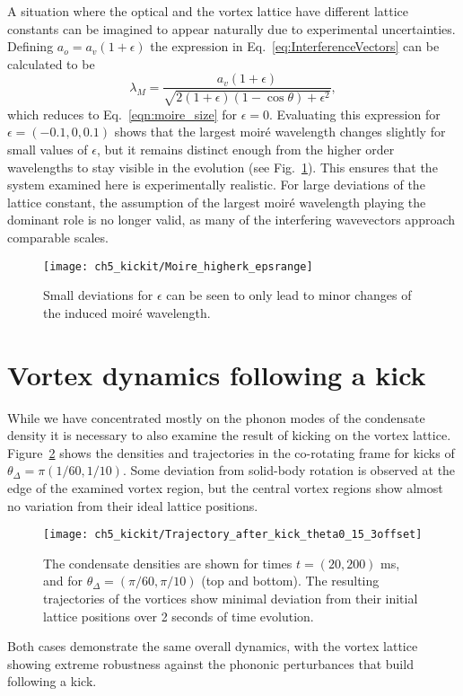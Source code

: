     A situation where the optical and the vortex lattice have different lattice constants can be imagined to appear naturally due to experimental uncertainties. Defining $a_o = a_v(1+\epsilon)$ the expression in Eq.~\eqref{eq:InterferenceVectors} can be calculated to be
    \begin{equation}
    	\lambda_M = \frac{a_v(1+\epsilon)}{\sqrt{2(1+\epsilon)(1-\cos\theta) + \epsilon^2}},
    	\label{eqn:moire_size_eps}
    \end{equation}
    which reduces to Eq.~\eqref{eqn:moire_size} for $\epsilon=0$. Evaluating this expression for $\epsilon = (-0.1,0,0.1)$ shows that the largest moir\'e wavelength changes slightly for small values of $\epsilon$, but it remains distinct enough from the higher order wavelengths to stay visible in the evolution (see Fig.~\ref{fig:epsilon}). This ensures that the system examined here is experimentally realistic. For large deviations of the lattice constant, the assumption of the largest moir\'e wavelength playing the dominant role is no longer valid, as many of the interfering wavevectors approach comparable scales.

    \begin{figure}
        \centering
        \texttt{[image: ch5\_kickit/Moire\_higherk\_epsrange]}
    	\caption[Moir\'e wavelengths for imperfect lattice alignment.]{Small deviations for $\epsilon$ can be seen to only lead to minor changes of the induced moir\'e wavelength.}\label{fig:epsilon}
    \end{figure}

\section{Vortex dynamics following a kick}\label{sec:moire_dyn_lattice}
While we have concentrated mostly on the phonon modes of the condensate density it is necessary to also examine the result of kicking on the vortex lattice. Figure~\ref{fig:kickit_traj} shows the densities and trajectories in the co-rotating frame for kicks of $\theta_{\Delta}=\pi (1/60, 1/10)$. Some deviation from solid-body rotation is observed at the edge of the examined vortex region, but the central vortex regions show almost no variation from their ideal lattice positions.
\begin{figure}
    \centering
    \texttt{[image: ch5\_kickit/Trajectory\_after\_kick\_theta0\_15\_3offset]}
	\caption[Vortex densities and trajectories following a kick.]{The condensate densities are shown for times $t=(20,200)$ ms, and for $\theta_\Delta = (\pi/60,\pi/10)$ (top and bottom). The resulting trajectories of the vortices show minimal deviation from their initial lattice positions over 2 seconds of time evolution.}\label{fig:kickit_traj}
\end{figure}
Both cases demonstrate the same overall dynamics, with the vortex lattice showing extreme robustness against the phononic perturbances that build following a kick.

